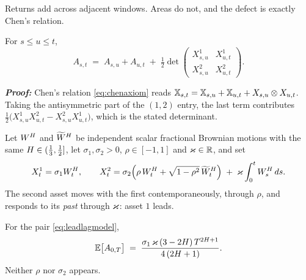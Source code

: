 Returns add across adjacent windows. Areas do not, and the defect is exactly Chen's relation.

\begin{proposition}\label{prop:chenarea}
For $s\leq u\leq t$,
\begin{equation}\label{eq:chenarea}
  A_{s,t}\;=\;A_{s,u}+A_{u,t}
  \;+\;\tfrac12\det\begin{pmatrix} X^{1}_{s,u} & X^{1}_{u,t}\\[2pt] X^{2}_{s,u} & X^{2}_{u,t}\end{pmatrix}.
\end{equation}
\end{proposition}

\textbf{\textit{Proof:}} Chen's relation \eqref{eq:chenaxiom} reads
$\mathbb{X}_{s,t}=\mathbb{X}_{s,u}+\mathbb{X}_{u,t}+X_{s,u}\otimes X_{u,t}$. Taking the antisymmetric part of the
$(1,2)$ entry, the last term contributes
$\tfrac12\bigl(X^{1}_{s,u}X^{2}_{u,t}-X^{2}_{s,u}X^{1}_{u,t}\bigr)$, which is the stated
determinant. \qedfilledtext

\medskip


\begin{definition}\label{def:leadlag}
Let $W^{H}$ and $\widetilde{W}^{H}$ be independent scalar fractional Brownian motions with the same
$H\in(\tfrac13,\tfrac12]$, let $\sigma_{1},\sigma_{2}>0$, $\rho\in[-1,1]$ and $\varkappa\in\mathbb{R}$, and
set
\begin{equation}\label{eq:leadlagmodel}
  X^{1}_{t}=\sigma_{1}W^{H}_{t},
  \qquad
  X^{2}_{t}=\sigma_{2}\Bigl(\rho\,W^{H}_{t}+\sqrt{1-\rho^{2}}\,\widetilde{W}^{H}_{t}\Bigr)
  \;+\;\varkappa\int_{0}^{t}W^{H}_{s}\,d s .
\end{equation}
The second asset moves with the first contemporaneously, through $\rho$, and responds to its
\emph{past} through $\varkappa$: asset $1$ leads.
\end{definition}

\begin{proposition}\label{prop:leadlagarea}
For the pair \eqref{eq:leadlagmodel},
\begin{equation}\label{eq:leadlagarea}
  \mathbb{E}\bigl[A_{0,T}\bigr]
  \;=\;\frac{\sigma_{1}\,\varkappa\,(3-2H)\,T^{2H+1}}{4\,(2H+1)} .
\end{equation}
Neither $\rho$ nor $\sigma_{2}$ appears.
\end{proposition}

